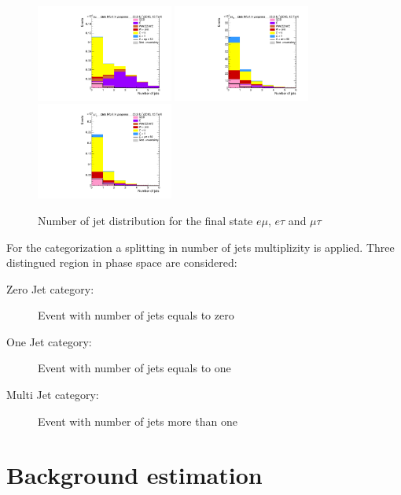 \begin{figure}[htp]
	\centering
	\includegraphics[width=0.4\textwidth]{plots/em/NumberOfJets.pdf}
	\includegraphics[width=0.4\textwidth]{plots/et/NumberOfJets.pdf}
	\includegraphics[width=0.4\textwidth]{plots/mt/NumberOfJets.pdf}

	\caption[Number of jet distribution of each final state]{Number of jet distribution for the final state $e\mu$, $e\tau$ and $\mu\tau$}
	\label{fig:fig_3_7}
\end{figure}

For the categorization a splitting in number of jets multiplizity is applied. Three distingued region in phase space are considered:

\begin{description}
	\item [Zero Jet category:] Event with number of jets equals to zero 
	\item [One Jet category:] Event with number of jets equals to one
	\item [Multi Jet category:] Event with number of jets more than one
\end{description}


\section{Background estimation}

